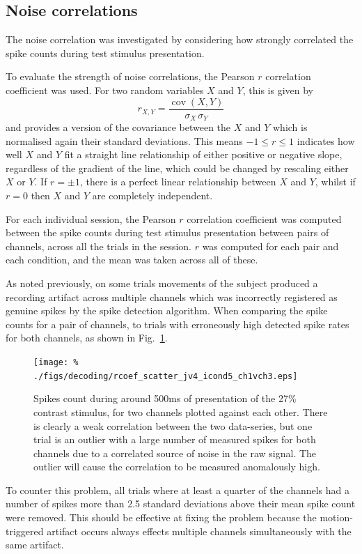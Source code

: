 \subsection{Noise correlations}
\label{sec:dec-meth-noise}

The noise correlation was investigated by considering how strongly correlated the spike counts during test stimulus presentation.

To evaluate the strength of noise correlations, the Pearson $r$ correlation coefficient was used.
For two random variables $X$ and $Y$, this is given by
$$r_{X,Y} = \frac{\operatorname{cov}(X,Y)}{\sigma_X \, \sigma_Y}$$
and provides a version of the covariance between the $X$ and $Y$ which is normalised again their standard deviations.
This means $-1 \le r \le 1$ indicates how well $X$ and $Y$ fit a straight line relationship of either positive or negative slope, regardless of the gradient of the line, which could be changed by rescaling either $X$ or $Y$.
If $r=\pm1$, there is a perfect linear relationship between $X$ and $Y$, whilst if $r=0$ then $X$ and $Y$ are completely independent.

For each individual session, the Pearson $r$ correlation coefficient was computed between the spike counts during test stimulus presentation between pairs of channels, across all the trials in the session.
$r$ was computed for each pair and each condition, and the mean was taken across all of these.

As noted previously, on some trials movements of the subject produced a recording artifact across multiple channels which was incorrectly registered as genuine spikes by the spike detection algorithm.
When comparing the spike counts for a pair of channels, to trials with erroneously high detected spike rates for both channels, as shown in Fig.~\ref{fig:noise_scatter}.

\begin{figure}[htbp]
\centering\texttt{[image: \%
./figs/decoding/rcoef\_scatter\_jv4\_icond5\_ch1vch3.eps]}
\caption{Spikes count during around 500ms of presentation of the 27\% contrast stimulus, for two channels plotted against each other.
There is clearly a weak correlation between the two data-series, but one trial is an outlier with a large number of measured spikes for both channels due to a correlated source of noise in the raw signal.
The outlier will cause the correlation to be measured anomalously high.}
\label{fig:noise_scatter}
\end{figure}

To counter this problem, all trials where at least a quarter of the channels had a number of spikes more than 2.5 standard deviations above their mean spike count were removed.
This should be effective at fixing the problem because the motion-triggered artifact occurs always effects multiple channels simultaneously with the same artifact.
